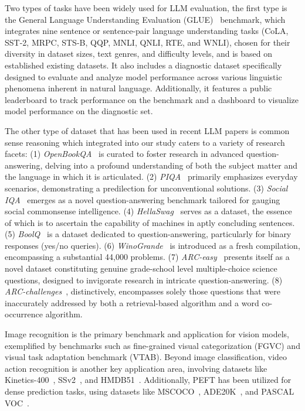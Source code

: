 Two types of tasks have been widely used for LLM evaluation, the first type is the General Language Understanding Evaluation (GLUE)~\cite{Glue-task} benchmark, which integrates nine sentence or sentence-pair language understanding tasks (CoLA, SST-2, MRPC, STS-B, QQP, MNLI, QNLI, RTE, and WNLI), chosen for their diversity in dataset sizes, text genres, and difficulty levels, and is based on established existing datasets. It also includes a diagnostic dataset specifically designed to evaluate and analyze model performance across various linguistic phenomena inherent in natural language. Additionally, it features a public leaderboard to track performance on the benchmark and a dashboard to visualize model performance on the diagnostic set.

The other type of dataset that has been used in recent LLM papers is common sense reasoning which integrated into our study caters to a variety of research facets:
(1) \textit{OpenBookQA}~\cite{OpenBookQA2018} is curated to foster research in advanced question-answering, delving into a profound understanding of both the subject matter and the language in which it is articulated. (2) \textit{PIQA}~\cite{piqa} primarily emphasizes everyday scenarios, demonstrating a predilection for unconventional solutions. (3) \textit{Social IQA}~\cite{socialiqa} emerges as a novel question-answering benchmark tailored for gauging social commonsense intelligence. (4) \textit{HellaSwag}~\cite{zellers2019hellaswag} serves as a dataset, the essence of which is to ascertain the capability of machines in aptly concluding sentences. (5) \textit{BoolQ}~\cite{boolq} is a dataset dedicated to question-answering, particularly for binary responses (yes/no queries). (6) \textit{WinoGrande}~\cite{ai2:winogrande} is introduced as a fresh compilation, encompassing a substantial 44,000 problems. (7) \textit{ARC-easy}~\cite{ARC} presents itself as a novel dataset constituting genuine grade-school level multiple-choice science questions, designed to invigorate research in intricate question-answering. (8) \textit{ARC-challenges}~\cite{ARC}, distinctively, encompasses solely those questions that were inaccurately addressed by both a retrieval-based algorithm and a word co-occurrence algorithm.

Image recognition is the primary benchmark and application for vision models, exemplified by benchmarks such as fine-grained visual categorization (FGVC) and visual task adaptation benchmark (VTAB).
Beyond image classification, video action recognition is another key application area, involving datasets like Kinetics-400~\cite{kay2017kinetics}, SSv2~\cite{goyal2017something}, and HMDB51~\cite{kuehne2011hmdb}. Additionally, PEFT has been utilized for dense prediction tasks, using datasets like MSCOCO~\cite{lin2014microsoft}, ADE20K~\cite{zhou2017scene}, and PASCAL VOC~\cite{everingham2010pascal}. 


